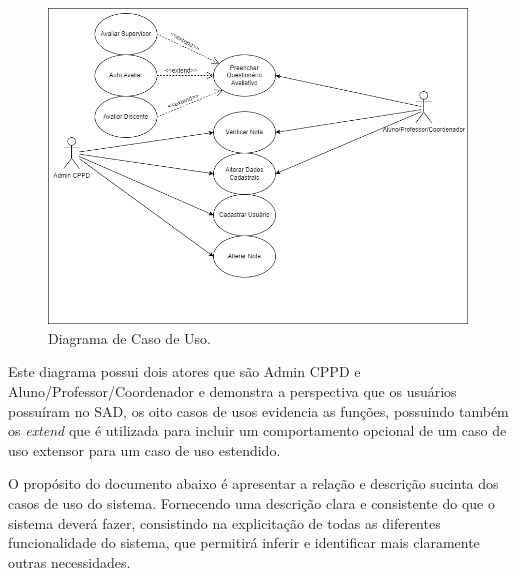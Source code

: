     \begin{figure}[h]
    \centering
    \includegraphics[width=0.99\textwidth]{./img/CasoUso.png}
    \caption{Diagrama de Caso de Uso.}
    \label{fig:CasoUso}
    \end{figure}
  
    Este diagrama possui dois atores que são Admin CPPD e Aluno/Professor/Coordenador e demonstra a perspectiva que os usuários possuíram no SAD, os oito casos de usos evidencia as funções, possuindo também os \textit{extend} que é utilizada para incluir um comportamento opcional de um caso de uso extensor para um caso de uso estendido.

    O propósito do documento abaixo é apresentar a relação e descrição sucinta dos casos de uso do sistema. Fornecendo uma descrição clara e consistente do que o sistema deverá fazer, consistindo na explicitação de todas as diferentes funcionalidade do sistema, que permitirá inferir e identificar mais claramente outras necessidades.

